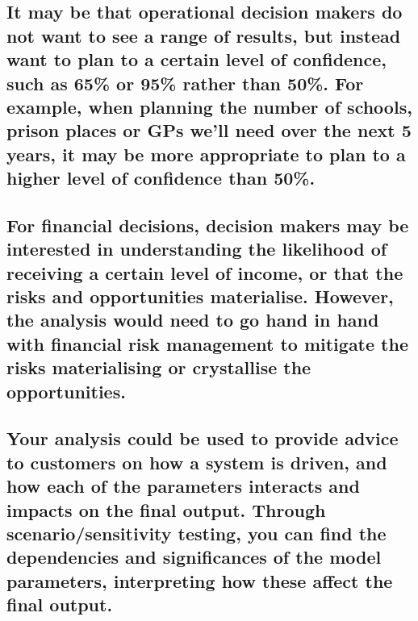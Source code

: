 \documentclass[]{book}
\begin{document}
\subsection{It may be that operational decision makers do not want to
see a range of results, but instead want to plan to a certain level of
confidence, such as 65\% or 95\% rather than 50\%. For example, when
planning the number of schools, prison places or GPs we'll need over the
next 5 years, it may be more appropriate to plan to a higher level of
confidence than
50\%.}\label{it-may-be-that-operational-decision-makers-do-not-want-to-see-a-range-of-results-but-instead-want-to-plan-to-a-certain-level-of-confidence-such-as-65-or-95-rather-than-50.-for-example-when-planning-the-number-of-schools-prison-places-or-gps-well-need-over-the-next-5-years-it-may-be-more-appropriate-to-plan-to-a-higher-level-of-confidence-than-50.}

\subsection{For financial decisions, decision makers may be interested
in understanding the likelihood of receiving a certain level of income,
or that the risks and opportunities materialise. However, the analysis
would need to go hand in hand with financial risk management to mitigate
the risks materialising or crystallise the
opportunities.}\label{for-financial-decisions-decision-makers-may-be-interested-in-understanding-the-likelihood-of-receiving-a-certain-level-of-income-or-that-the-risks-and-opportunities-materialise.-however-the-analysis-would-need-to-go-hand-in-hand-with-financial-risk-management-to-mitigate-the-risks-materialising-or-crystallise-the-opportunities.}

\subsection{Your analysis could be used to provide advice to customers
on how a system is driven, and how each of the parameters interacts and
impacts on the final output. Through scenario/sensitivity testing, you
can find the dependencies and significances of the model parameters,
interpreting how these affect the final
output.}\label{your-analysis-could-be-used-to-provide-advice-to-customers-on-how-a-system-is-driven-and-how-each-of-the-parameters-interacts-and-impacts-on-the-final-output.-through-scenariosensitivity-testing-you-can-find-the-dependencies-and-significances-of-the-model-parameters-interpreting-how-these-affect-the-final-output.}
\end{document}
